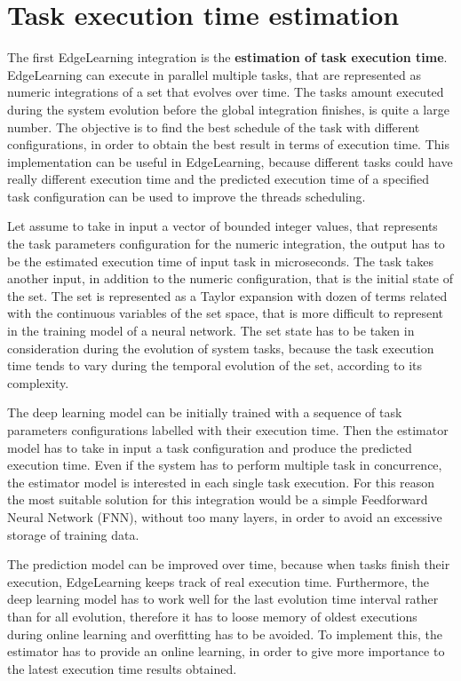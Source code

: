 \section{Task execution time estimation}

The first EdgeLearning integration is the \textbf{estimation of task execution time}. EdgeLearning can execute in parallel multiple tasks, that are represented as numeric integrations of a set that evolves over time. The tasks amount executed during the system evolution before the global integration finishes, is quite a large number. The objective is to find the best schedule of the task with different configurations, in order to obtain the best result in terms of execution time. This implementation can be useful in EdgeLearning, because different tasks could have really different execution time and the predicted execution time of a specified task configuration can be used to improve the threads scheduling. 

Let assume to take in input a vector of bounded integer values, that represents the task parameters configuration for the numeric integration, the output has to be the estimated execution time of input task in microseconds. The task takes another input, in addition to the numeric configuration, that is the initial state of the set. The set is represented as a Taylor expansion with dozen of terms related with the continuous variables of the set space, that is more difficult to represent in the training model of a neural network. The set state has to be taken in consideration during the evolution of system tasks, because the task execution time tends to vary during the temporal evolution of the set, according to its complexity. 

The deep learning model can be initially trained with a sequence of task parameters configurations labelled with their execution time. Then the estimator model has to take in input a task configuration and produce the predicted execution time. Even if the system has to perform multiple task in concurrence, the estimator model is interested in each single task execution. For this reason the most suitable solution for this integration would be a simple Feedforward Neural Network (FNN), without too many layers, in order to avoid an excessive storage of training data.

The prediction model can be improved over time, because when tasks finish their execution, EdgeLearning keeps track of real execution time. Furthermore, the deep learning model has to work well for the last evolution time interval rather than for all evolution, therefore it has to loose memory of oldest executions during online learning and overfitting has to be avoided. To implement this, the estimator has to provide an online learning, in order to give more importance to the latest execution time results obtained.


